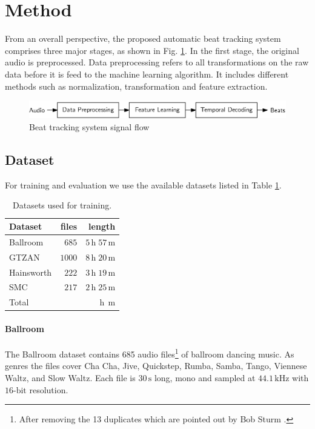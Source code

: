 \documentclass{scrartcl}
\begin{document}
\section{Method}

From an overall perspective, the proposed automatic beat tracking system comprises three major stages, as shown in Fig. \ref{fig:system}. In the first stage, the original audio is preprocessed. Data preprocessing refers to all transformations on the raw data before it is feed to the machine learning algorithm. It includes different methods such as normalization, transformation and feature extraction. 

\begin{figure}[htbp]
\centering
\includegraphics[scale=1.0]{figures/beat_tracking_system.eps}
\caption{Beat tracking system signal flow}
\label{fig:system}
\end{figure}  


\subsection{Dataset}
For training and evaluation we use the available datasets listed in Table \ref{tab:datasets}.
\begin{table}[htbp]
\caption{Datasets used for training.}
\label{tab:datasets}
\centering
\begin{tabular}{lrr}
\hline
\hline
\textbf{Dataset} & \textbf{files} & \textbf{length} \\
\hline
Ballroom \cite{Gouyon2006b, Krebs2013} & $685$ & $5\,\text{h} \;57\,\text{m}$\\
GTZAN \cite{Tzanetakis2002b, marchand2015swing} & $1000$ & $8\,\text{h}\;20\,\text{m}$\\
Hainsworth \cite{Hainsworth2004} & $222$ & $3\,\text{h}\;19\,\text{m}$\\
SMC \cite{Holzapfel2012} & $217$ & $2\,\text{h}\;25\,\text{m}$\\    
\hline
Total & $ $ & $ \,\text{h}\; \,\text{m}$\\  
\hline
\hline
\end{tabular}
\end{table}  

\paragraph{Ballroom} 
The Ballroom dataset \cite{Gouyon2006b, Krebs2013} contains 685 audio files\footnote{After removing the 13 duplicates which are pointed out by Bob Sturm \cite{Sturm2014}.} of ballroom dancing music. As genres the files cover Cha Cha, Jive, Quickstep, Rumba, Samba, Tango, Viennese Waltz, and Slow Waltz. Each file is $30\,\text{s}$ long, mono and sampled at $44.1\,\text{kHz}$ with $16\text{-bit}$ resolution.
\end{document}
